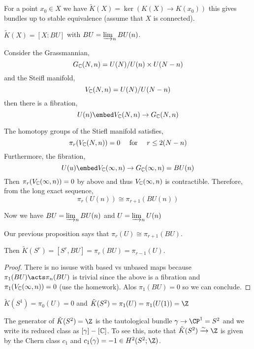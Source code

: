 \documentclass[12pt]{extarticle}
\begin{document}
\begin{defn}
For a point $x_0 \in X$ we have $\tilde{K}(X) = \ker{(K(X) \to K(x_0))}$ this gives bundles up to stable equivalence (assume that $X$ is connected). 
\end{defn}

\begin{prop}
$\tilde{K}(X) = [X : BU]$ with $BU = \varinjlim_n BU(n)$.
\end{prop}

\begin{rmk}
Consider the Grassmannian,
\[ G_{\mathbb{C}}(N, n) = U(N) / U(n) \times U(N-n) \]
and the Steifl manifold,
\[ V_{\mathbb{C}}(N, n) = U(N) / U(N-n) \]
then there is a fibration,
\[ U(n) \embed V_\C(N, n) \to G_\C(N, n) \]
\end{rmk}

\begin{prop}
The homotopy groups of the Stiefl manifold satisfies,
\[ \pi_r(V_{\mathbb{C}}(N, n)) = 0 \quad \text{ for } \quad r \le 2 (N - n) \]
Furthermore, the fibration,
\[ U(u) \embed V_\C(\infty, n) \to G_\C(\infty, n) = BU(n) \]
Then $\pi_r(V_{\mathbb{C}}(\infty, n)) = 0$ by above and thus $V_{\mathbb{C}}(\infty, n)$ is contractible. Therefore, from the long exact sequence,
\[ \pi_r(U(n)) \cong \pi_{r+1}(BU(n)) \]
\end{prop}

\begin{defn}
Now we have $BU = \varinjlim_n BU(n)$ and $U = \varinjlim_n U(n)$
\end{defn}

\begin{rmk}
Our previous proposition says that $\pi_r(U) \cong \pi_{r+1}(BU)$. 
\end{rmk}

\begin{prop}
Then $\tilde{K}(S^r) = [S^r, BU] = \pi_r(BU) = \pi_{r-1}(U)$. 
\end{prop}

\begin{proof}
There is no issuse with based vs unbased maps because $\pi_1(BU) \acts \pi_n(BU)$ is trivial since the above is a fibration and $\pi_1(V_{\mathbb{C}}(\infty, n)) = 0$ (use the homework). Alos $\pi_1(BU) = 0$ so we can conclude.
\end{proof}

\begin{example}
$\tilde{K}(S^1) = \pi_0(U) = 0$ and $\tilde{K}(S^2) = \pi_1(U) = \pi_1(U(1)) = \Z$ 
\end{example}

\begin{rmk}
The generator of $\tilde{K}(S^2) = \Z$ is the tautological bundle $\gamma \to \CP^1 = S^2$ and we write its reduced class as $[\gamma] - [\mathbb{C}]$. To see this, note that $\tilde{K}(S^2) \xrightarrow{\sim} \Z$ is given by the Chern class $c_1$ and $c_1(\gamma) = -1 \in H^2(S^2; \Z)$.
\end{rmk}
\end{document}
